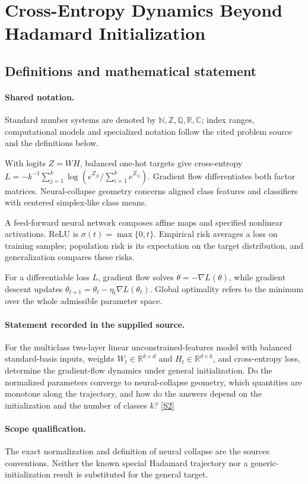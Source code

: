 \documentclass[11pt]{article}
\newcommand{\sref}[2]{\hyperlink{source:#1:#2}{[S#2]}}
\begin{document}
\section{Cross-Entropy Dynamics Beyond Hadamard Initialization}\label{statement}

\subsection{Definitions and mathematical statement}

\paragraph{Shared notation.}Standard number systems are denoted by $\mathbb N,\mathbb Z,\mathbb Q,\mathbb R,\mathbb C$; index ranges, computational models and specialized notation follow the cited problem source and the definitions below.


With logits $Z=WH$, balanced one-hot targets give cross-entropy $L=-k^{-1}\sum_{j=1}^k\log(e^{Z_{jj}}/\sum_{i=1}^ke^{Z_{ij}})$. Gradient flow differentiates both factor matrices. Neural-collapse geometry concerns aligned class features and classifiers with centered simplex-like class means.

A feed-forward neural network composes affine maps and specified nonlinear activations. ReLU is $\sigma(t)=\max\{0,t\}$. Empirical risk averages a loss on training samples; population risk is its expectation on the target distribution, and generalization compares these risks.

For a differentiable loss $L$, gradient flow solves $\dot\theta=-\nabla L(\theta)$, while gradient descent updates $\theta_{t+1}=\theta_t-\eta_t\nabla L(\theta_t)$. Global optimality refers to the minimum over the whole admissible parameter space.
\paragraph{Statement recorded in the supplied source.}
For the multiclass two-layer linear unconstrained-features model with balanced standard-basis inputs, weights $W_t\in\mathbb R^{k\times d}$ and $H_t\in\mathbb R^{d\times k}$, and cross-entropy loss, determine the gradient-flow dynamics under general initialization. Do the normalized parameters converge to neural-collapse geometry, which quantities are monotone along the trajectory, and how do the answers depend on the initialization and the number of classes $k$? \sref{statement}{2}
\paragraph{Scope qualification.}
The exact normalization and definition of neural collapse are the source\textquotesingle s conventions. Neither the known special Hadamard trajectory nor a generic-initialization result is substituted for the general target.
\end{document}
